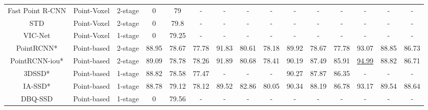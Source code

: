 \begin{table}
{\begin{tabular}{c|c|c|ccc|ccc|ccc|ccc}
		Fast Point R-CNN \cite{chen2019fast}        & Point-Voxel                & 2-stage               & 0              & 79             & -              & -              & -                      & -              & -                      & -              & -              & -              & -              & -               \\
		STD \cite{yang2019std}                     & Point-Voxel                & 2-stage               & 0              & 79.8           & -              & -              & -                      & -              & -                      & -              & -              & -              & -              & -               \\
		VIC-Net \cite{jiang2021vic}                 & Point-Voxel                & 1-stage               & 0              & 79.25          & -              & -              & -                      & -              & -                      & -              & -              & -              & -              & -               \\ 
		\hline
		PointRCNN* \cite{shi2019pointrcnn}              & Point-based                & 2-stage               & 88.95          & 78.67          & 77.78          & 91.83          & 80.61                  & 78.18          & 89.92                  & 78.67          & 77.78          & 93.07          & 88.85          & 86.73           \\
		PointRCNN-iou* \cite{shi2019pointrcnn}          & Point-based                & 2-stage               & 89.09          & 78.78          & 78.26          & 91.89          & 80.68                  & 78.41          & 90.19                  & 87.49          & 85.91          & \uline{94.99}  & 88.82          & 86.71           \\
		3DSSD* \cite{yang20203dssd}                  & Point-based                & 1-stage               & 88.82          & 78.58          & 77.47          & -              & -                      & -              & 90.27                  & 87.87          & 86.35          & -              & -              & -               \\
		IA-SSD* \cite{zhang2022not}                 & Point-based                & 1-stage               & 88.78          & 79.12          & 78.12          & 89.52          & 82.86                  & 80.05          & 90.34                  & 88.19          & 86.78          & 93.17          & 89.54          & 88.64           \\
		DBQ-SSD \cite{yang2022dbq}                 & Point-based                & 1-stage               & 0              & 79.56          & -              & -              & -                      & -              & -                      & -              & -              & -              & -              & -               \\

\end{tabular}}
\end{table}
